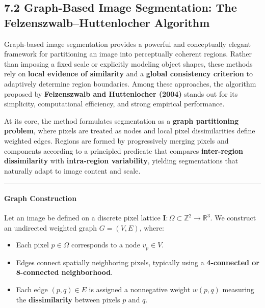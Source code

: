 \documentclass[11pt]{article}
\providecommand{\tightlist}{%
      \setlength{\itemsep}{0pt}\setlength{\parskip}{0pt}}
\begin{document}
    \hypertarget{graph-based-image-segmentation-the-felzenszwalbhuttenlocher-algorithm}{%
\subsection{\texorpdfstring{\textbf{7.2 Graph-Based Image Segmentation:
The Felzenszwalb--Huttenlocher
Algorithm}}{7.2 Graph-Based Image Segmentation: The Felzenszwalb--Huttenlocher Algorithm}}\label{graph-based-image-segmentation-the-felzenszwalbhuttenlocher-algorithm}}

Graph-based image segmentation provides a powerful and conceptually
elegant framework for partitioning an image into perceptually coherent
regions. Rather than imposing a fixed scale or explicitly modeling
object shapes, these methods rely on \textbf{local evidence of
similarity} and a \textbf{global consistency criterion} to adaptively
determine region boundaries. Among these approaches, the algorithm
proposed by \textbf{Felzenszwalb and Huttenlocher (2004)} stands out for
its simplicity, computational efficiency, and strong empirical
performance.

At its core, the method formulates segmentation as a \textbf{graph
partitioning problem}, where pixels are treated as nodes and local pixel
dissimilarities define weighted edges. Regions are formed by
progressively merging pixels and components according to a principled
predicate that compares \textbf{inter-region dissimilarity} with
\textbf{intra-region variability}, yielding segmentations that naturally
adapt to image content and scale.

\begin{center}\rule{0.5\linewidth}{0.5pt}\end{center}

\hypertarget{graph-construction}{%
\paragraph{\texorpdfstring{\textbf{Graph
Construction}}{Graph Construction}}\label{graph-construction}}

Let an image be defined on a discrete pixel lattice
\(\mathbf{I} : \Omega \subset \mathbb{Z}^2 \rightarrow \mathbb{R}^3\).
We construct an undirected weighted graph \(G = (V, E)\), where:

\begin{itemize}
\tightlist
\item
  Each pixel \(p \in \Omega\) corresponds to a node \(v_p \in V\).
\item
  Edges connect spatially neighboring pixels, typically using a
  \textbf{4-connected or 8-connected neighborhood}.
\item
  Each edge \((p,q) \in E\) is assigned a nonnegative weight \(w(p,q)\)
  measuring the \textbf{dissimilarity} between pixels \(p\) and \(q\).
\end{itemize}
\end{document}
